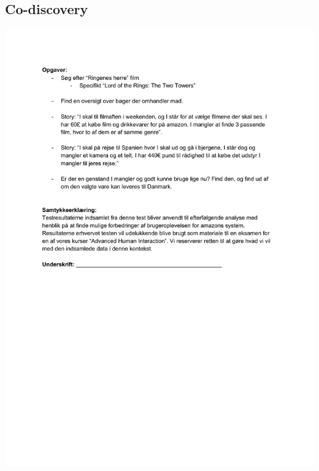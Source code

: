 \documentclass[fleqn]{IOS-Book-Article}
\begin{document}
\subsection{Co-discovery} \label{appendix:codiscovery}
\includegraphics[scale=0.8]{./includes/opgaver_og_samtykkeerklaering.pdf}
\end{document}
